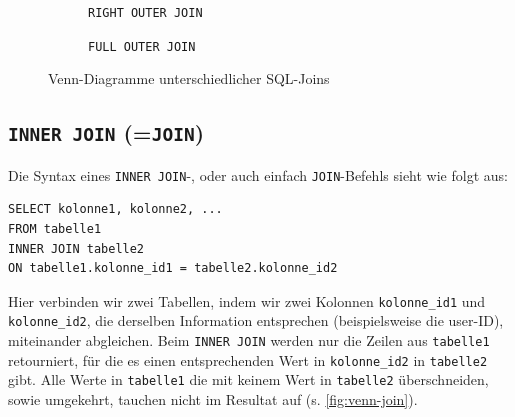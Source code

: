\begin{figure}[htbp]
  \begin{subfigure}[b]{0.45\textwidth}
    \centering
    \caption{\lstinline[style=sql]|RIGHT OUTER JOIN|}
  \end{subfigure}
  \hfill
  \begin{subfigure}[b]{0.45\textwidth}
    \centering
    \caption{\lstinline[style=sql]|FULL OUTER JOIN|}
  \end{subfigure}
  \caption{Venn-Diagramme unterschiedlicher SQL-Joins}
  \label{fig:venn-joins}
\end{figure}


\subsection{\texorpdfstring{\lstinline[style=sql]|INNER JOIN| (=\lstinline[style=sql]|JOIN|)}{INNER JOIN (=JOIN)}}
Die Syntax eines \lstinline[style=sql]|INNER JOIN|-, oder auch einfach \lstinline[style=sql]|JOIN|-Befehls sieht wie folgt aus:

\begin{lstlisting}[style=sql]
SELECT kolonne1, kolonne2, ...
FROM tabelle1
INNER JOIN tabelle2
ON tabelle1.kolonne_id1 = tabelle2.kolonne_id2
\end{lstlisting}
Hier verbinden wir zwei Tabellen, indem wir zwei Kolonnen \texttt{kolonne\_id1} und \texttt{kolonne\_id2}, die derselben Information entsprechen (beispielsweise die user-ID), miteinander abgleichen. Beim \lstinline[style=sql]|INNER JOIN| werden nur die Zeilen aus \texttt{tabelle1} retourniert, für die es einen entsprechenden Wert in \texttt{kolonne\_id2} in \texttt{tabelle2} gibt. Alle Werte in \texttt{tabelle1} die mit keinem Wert in \texttt{tabelle2} überschneiden, sowie umgekehrt, tauchen nicht im Resultat auf (s. \cref{fig:venn-join}).

